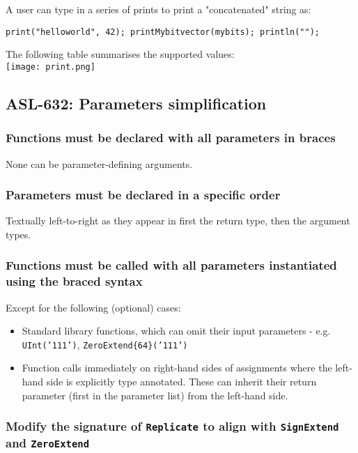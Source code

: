 A user can type in a series of prints to print a "concatenated" string as:
\begin{verbatim}
print("helloworld", 42); printMybitvector(mybits); println("");
\end{verbatim}

The following table summarises the supported values:\\
\texttt{[image: print.png]}

\subsection{ASL-632: Parameters simplification}

\subsubsection{Functions must be declared with all parameters in braces}
None can be parameter-defining arguments.

\subsubsection{Parameters must be declared in a specific order}

Textually left-to-right as they appear in first the return type, then the
argument types.

\subsubsection{Functions must be called with all parameters instantiated using the braced syntax}
Except for the following (optional) cases:
\begin{itemize}
\item Standard library functions, which can omit their input parameters -
e.g. \texttt{UInt('111')}, \texttt{ZeroExtend\{64\}('111')}
\item Function calls immediately on right-hand sides of assignments where
the left-hand side is explicitly type annotated. These can inherit their
return parameter (first in the parameter list) from the left-hand side.
\end{itemize}

\subsubsection{Modify the signature of \texttt{Replicate} to align with \texttt{SignExtend} and \texttt{ZeroExtend}}

